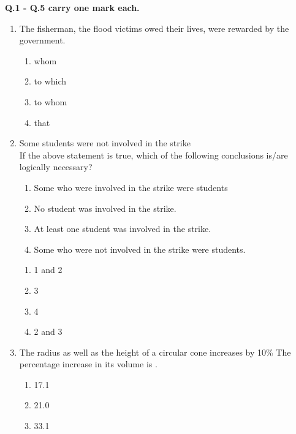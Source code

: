\documentclass[12pt]{article}
\begin{document}
\noindent\textbf{Q.1 - Q.5 carry one mark each.}\\
\begin{enumerate}[label = Q.\arabic*]
	\item The fisherman, \underline{\hspace{2cm}} the flood victims owed their lives, were rewarded by the government.
		\begin{multicols}{4}
			\begin{enumerate}[label=(\Alph*)]
				\item whom
				\item to which
				\item to whom
				\item that
			\end{enumerate}
		\end{multicols}
	\item Some students were not involved in the strike \\[1em]
		If the above statement is true, which of the following conclusions is/are logically necessary?
		\begin{enumerate}[label=\arabic*.]
			\item Some who were involved in the strike were students 
			\item No student was involved in the strike.
			\item At least one student was involved in the strike.
			\item Some who were not involved in the strike were students.
		\end{enumerate}
		\begin{multicols}{4}
			\begin{enumerate}[label=(\Alph*)]
				\item 1 and 2 \item 3 \item 4 \item 2 and 3
			\end{enumerate}
		\end{multicols}
	\item The radius as well as the height of a circular cone increases by 10\% The percentage increase in its volume is \underline{\hspace{2cm}}.
		\begin{multicols}{4}
			\begin{enumerate}[label=(\Alph*)]
				\item 17.1
				\item 21.0
				\item 33.1

\end{enumerate}
\end{multicols}
\end{enumerate}
\end{document}
